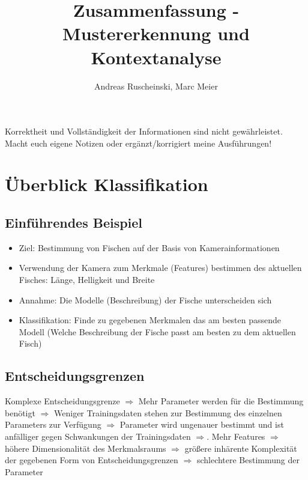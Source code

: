 \documentclass{article} %
\title{Zusammenfassung - Mustererkennung und Kontextanalyse}
\author{
	Andreas Ruscheinski,
	Marc Meier
}
\begin{document}
\maketitle
\begin{framed}Korrektheit und Vollständigkeit der Informationen sind nicht gewährleistet.
Macht euch eigene Notizen oder ergänzt/korrigiert meine Ausführungen!
\end{framed}

\tableofcontents

\section{Überblick Klassifikation}
	\subsection{Einführendes Beispiel}
	\begin{itemize}
		\item Ziel: Bestimmung von Fischen auf der Basis von Kamerainformationen
		\item Verwendung der Kamera zum Merkmale (Features) bestimmen des aktuellen Fisches: Länge, Helligkeit und Breite
		\item Annahme: Die Modelle (Beschreibung) der Fische unterscheiden sich
		\item Klassifikation: Finde zu gegebenen Merkmalen das am besten passende Modell (Welche Beschreibung der Fische passt am besten zu dem aktuellen Fisch)
	\end{itemize}
	
	\subsection{Entscheidungsgrenzen}
		Komplexe Entscheidungsgrenze $\Rightarrow$ Mehr Parameter werden für die Bestimmung benötigt $\Rightarrow$ Weniger Trainingsdaten stehen zur Bestimmung des einzelnen Parameters zur Verfügung $\Rightarrow$ Parameter wird ungenauer bestimmt und ist anfälliger gegen Schwankungen der Trainingsdaten $\Rightarrow$.
		Mehr Features $\Rightarrow$ höhere Dimensionalität des Merkmalsraums $\Rightarrow$ größere inhärente Komplexität der gegebenen Form von Entscheidungsgrenzen $\Rightarrow$ schlechtere Bestimmung der Parameter
\end{document}

